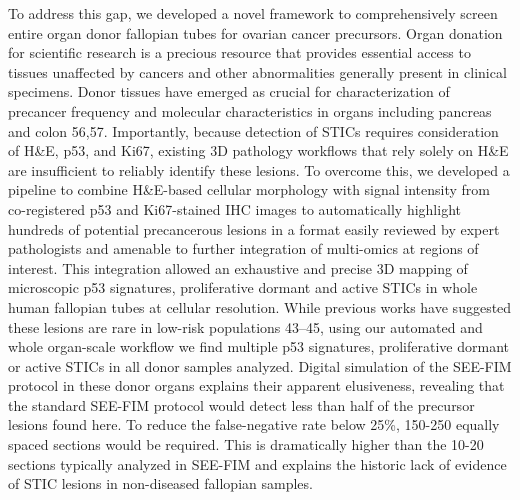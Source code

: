 \begin{refsection}
    To address this gap, we developed a novel framework to comprehensively screen entire organ donor fallopian tubes for ovarian cancer precursors. Organ donation for scientific research is a precious resource that provides essential access to tissues unaffected by cancers and other abnormalities generally present in clinical specimens. Donor tissues have emerged as crucial for characterization of precancer frequency and molecular characteristics in organs including pancreas and colon\cite{Carpenter2023Analysis,Penz2023Colorectal} 56,57. Importantly, because detection of STICs requires consideration of H\&E, p53, and Ki67, existing 3D pathology workflows that rely solely on H\&E are insufficient to reliably identify these lesions. To overcome this, we developed a pipeline to combine H\&E-based cellular morphology with signal intensity from co-registered p53 and Ki67-stained IHC images to automatically highlight hundreds of potential precancerous lesions in a format easily reviewed by expert pathologists and amenable to further integration of multi-omics at regions of interest. This integration allowed an exhaustive and precise 3D mapping of microscopic p53 signatures, proliferative dormant and active STICs in whole human fallopian tubes at cellular resolution.
    While previous works have suggested these lesions are rare in low-risk populations\cite{Meserve2017Frequency,Rabban2014Early,Samimi2018Population} 43–45, using our automated and whole organ-scale workflow we find multiple p53 signatures, proliferative dormant or active STICs in all donor samples analyzed. Digital simulation of the SEE-FIM protocol in these donor organs explains their apparent elusiveness, revealing that the standard SEE-FIM protocol would detect less than half of the precursor lesions found here. To reduce the false-negative rate below 25\%, 150-250 equally spaced sections would be required. This is dramatically higher than the 10-20 sections typically analyzed in SEE-FIM and explains the historic lack of evidence of STIC lesions in non-diseased fallopian samples.

\end{refsection}
